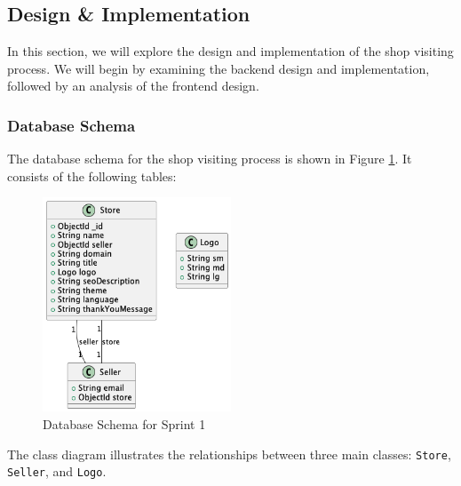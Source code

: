 \subsection{Design \& Implementation}
In this section, we will explore the design and implementation of the shop visiting process. We will begin by examining the backend design and implementation, followed by an analysis of the frontend design.

\subsubsection{Database Schema}
The database schema for the shop visiting process is shown in Figure \ref{fig:db_schema_sprint1}. It consists of the following tables:

\begin{figure}[H]
    \centering
    \includegraphics[width=0.5\textwidth]{images/sprintOneClass.png}
    \caption{Database Schema for Sprint 1}
    \label{fig:db_schema_sprint1}
\end{figure}


The class diagram illustrates the relationships between three main classes: \texttt{Store}, \texttt{Seller}, and \texttt{Logo}.

